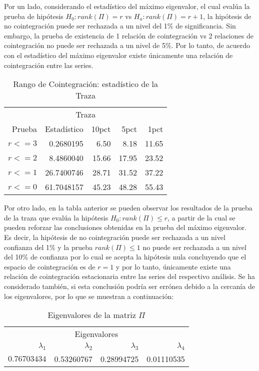 Por un lado, considerando  el estadístico del máximo eigenvalor, el cual evalúa la prueba de hipótesis $H_0:rank(\Pi)=r$ vs $H_a:rank(\Pi)=r+1$, la hipótesis de no cointegración puede ser rechazada a un nivel del 1\% de significancia. Sin embargo, la prueba de existencia de 1 relación de cointegración vs 2 relaciones de cointegración no puede ser rechazada a un nivel de 5\%. Por lo tanto, de acuerdo con el estadístico del máximo eigenvalor existe únicamente una relación de cointegración entre las series.

\begin{table}[H]
\begin{center}
    \begin{tabular}{rrrrr}
    \hline
    \multicolumn{5}{c}{Traza} \\
        \cline{1-5}
        Prueba    		& Estadístico 		& 10pct 		& 5pct 		& 1pct \\
        \hline
        $r <= 3$		& 0.2680195		& 6.50		& 8.18		& 11.65    \\
        $r <= 2$		& 8.4860040		& 15.66		& 17.95		& 23.52    \\
        $r <= 1$		& 26.7400746		& 28.71		& 31.52		& 37.22   \\
        $r <= 0$		& 61.7048157		& 45.23		& 48.28		& 55.43   \\
        \hline
    \end{tabular}
\end{center}
\caption {Rango de Cointegración: estadístico de la Traza} \label{tab:traza} 
\end{table}


Por otro lado, en la tabla anterior se pueden observar los resultados de la prueba de la traza que evalúa la hipótesis $H_0: rank(\Pi)\leq r$, a partir de la cual se pueden reforzar las conclusiones obtenidas en la prueba del máximo eigenvalor. Es decir, la hipótesis de no cointegración puede ser rechazada a un nivel confianza del 1\% y la prueba $rank(\Pi) \leq 1$ no puede ser rechazada a un nivel del 10\% de confianza por lo cual se acepta la hipótesis nula concluyendo que el espacio de cointegración es de $r=1$ y por lo tanto, únicamente existe una relación de cointegración estacionaria entre las series del respectivo análisis. Se ha considerado también, si esta conclusión podría ser errónea debido a la cercanía de los eigenvalores, por lo que se muestran a continuación:


\begin{table}[H]
\begin{center}
    \begin{tabular}{rrrr}
    \hline
    \multicolumn{4}{c}{Eigenvalores} \\
        \cline{1-4}
        $\lambda_1$    		& $\lambda_2$  		& $\lambda_3$  		& $\lambda_4$ \\
        \hline
        $0.76703434$		& 0.53260767			& 0.28994725			& 0.01110535	   \\
        \hline
    \end{tabular}
\end{center}
\caption {Eigenvalores de la matriz $\Pi$} \label{tab:eigenvalues_list} 
\end{table}


